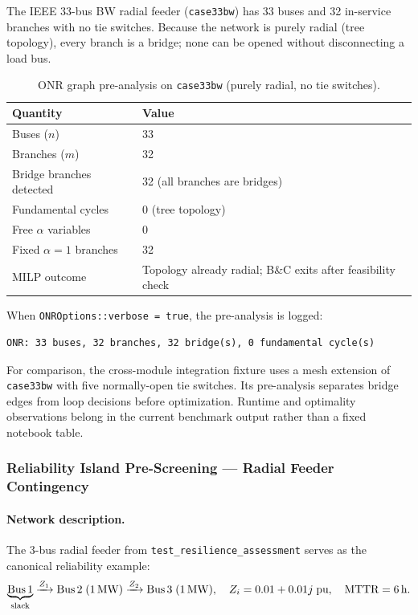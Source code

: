 The IEEE 33-bus BW radial feeder (\texttt{case33bw}) has 33 buses and 32
in-service branches with no tie switches.  Because the network is purely
radial (tree topology), every branch is a bridge; none can be opened without
disconnecting a load bus.

\begin{table}[ht]
\centering
\caption{ONR graph pre-analysis on \texttt{case33bw} (purely radial, no tie switches).}
\label{tab:onr_bridge_33bw}
\begin{tabular}{ll}
\hline
\textbf{Quantity} & \textbf{Value} \\
\hline
Buses ($n$)                        & 33 \\
Branches ($m$)                     & 32 \\
Bridge branches detected           & 32 (all branches are bridges) \\
Fundamental cycles                 & 0 (tree topology) \\
Free $\alpha$ variables            & 0 \\
Fixed $\alpha = 1$ branches        & 32 \\
MILP outcome                       & Topology already radial; B\&C exits after feasibility check \\
\hline
\end{tabular}
\end{table}

When \texttt{ONROptions::verbose = true}, the pre-analysis is logged:

\begin{verbatim}
ONR: 33 buses, 32 branches, 32 bridge(s), 0 fundamental cycle(s)
\end{verbatim}

For comparison, the cross-module integration fixture uses a mesh extension of
\texttt{case33bw} with five normally-open tie switches.  Its pre-analysis
separates bridge edges from loop decisions before optimization. Runtime and
optimality observations belong in the current benchmark output rather than a
fixed notebook table.

\subsubsection{Reliability Island Pre-Screening --- Radial Feeder Contingency}

\paragraph{Network description.}
The 3-bus radial feeder from \texttt{test\_resilience\_assessment} serves as
the canonical reliability example:
\[
  \underbrace{\text{Bus\,1}}_{\text{slack}}
  \xrightarrow{Z_1}\text{Bus\,2}\;(1\,\text{MW})
  \xrightarrow{Z_2}\text{Bus\,3}\;(1\,\text{MW}),
  \quad Z_i = 0.01 + 0.01j\;\text{pu}, \quad \text{MTTR} = 6\,\text{h}.
\]


